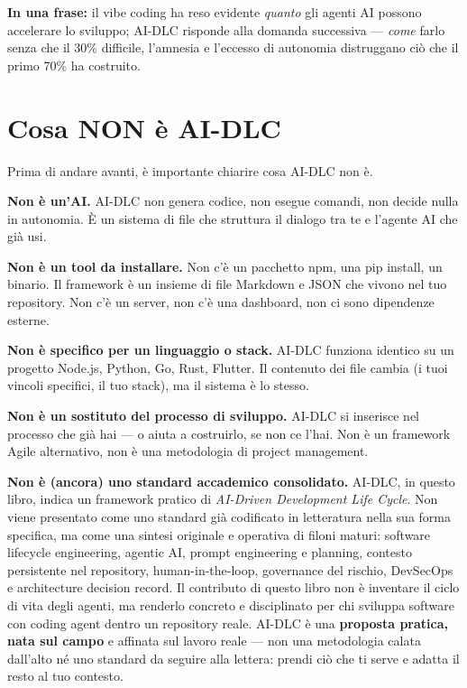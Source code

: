\begin{notebox}
\textbf{In una frase:} il vibe coding ha reso evidente \textit{quanto} gli agenti AI possono accelerare lo sviluppo; AI-DLC risponde alla domanda successiva --- \textit{come} farlo senza che il 30\% difficile, l'amnesia e l'eccesso di autonomia distruggano ciò che il primo 70\% ha costruito.
\end{notebox}

\section{Cosa NON è AI-DLC}
\label{sec:01-cosa-non-e}

Prima di andare avanti, è importante chiarire cosa AI-DLC non è.

\textbf{Non è un'AI.} AI-DLC non genera codice, non esegue comandi, non decide nulla in autonomia. È un sistema di file che struttura il dialogo tra te e l'agente AI che già usi.

\textbf{Non è un tool da installare.} Non c'è un pacchetto npm, una pip install, un binario. Il framework è un insieme di file Markdown e JSON che vivono nel tuo repository. Non c'è un server, non c'è una dashboard, non ci sono dipendenze esterne.

\textbf{Non è specifico per un linguaggio o stack.} AI-DLC funziona identico su un progetto Node.js, Python, Go, Rust, Flutter. Il contenuto dei file cambia (i tuoi vincoli specifici, il tuo stack), ma il sistema è lo stesso.

\textbf{Non è un sostituto del processo di sviluppo.} AI-DLC si inserisce nel processo che già hai --- o aiuta a costruirlo, se non ce l'hai. Non è un framework Agile alternativo, non è una metodologia di project management.

\textbf{Non è (ancora) uno standard accademico consolidato.} AI-DLC, in questo libro, indica un framework pratico di \textit{AI-Driven Development Life Cycle}. Non viene presentato come uno standard già codificato in letteratura nella sua forma specifica, ma come una sintesi originale e operativa di filoni maturi: software lifecycle engineering, agentic AI, prompt engineering e planning, contesto persistente nel repository, human-in-the-loop, governance del rischio, DevSecOps e architecture decision record. Il contributo di questo libro non è inventare il ciclo di vita degli agenti, ma renderlo concreto e disciplinato per chi sviluppa software con coding agent dentro un repository reale. AI-DLC è una \textbf{proposta pratica, nata sul campo} e affinata sul lavoro reale --- non una metodologia calata dall'alto né uno standard da seguire alla lettera: prendi ciò che ti serve e adatta il resto al tuo contesto.

